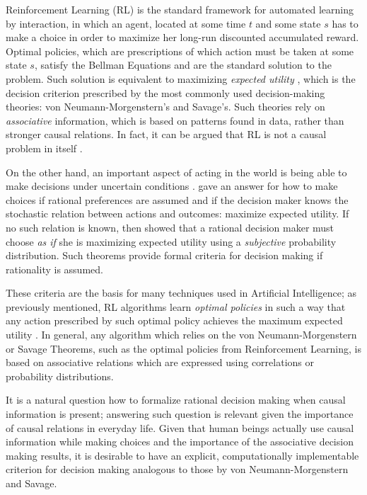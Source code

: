 \documentclass{svjour3}                     %
\begin{document}
Reinforcement Learning (RL) \citep{sutton1998reinforcement} is the standard framework for automated learning by interaction, in which an agent, located at some time $t$ and some state $s$ has to make a choice in order to maximize her long-run discounted accumulated reward. Optimal policies, which are prescriptions of which action must be taken at some state $s$, satisfy the Bellman Equations \citep{Puterman:1994:MDP:528623} and are the standard solution to the problem. Such solution is equivalent to maximizing \textit{expected utility} \citep{webb2007game}, which is the decision criterion prescribed by the most commonly used decision-making theories: von Neumann-Morgenstern's and Savage's. Such theories rely on \textit{associative} information, which is based on patterns found in data, rather than stronger causal relations. In fact, it can be argued that RL is not a causal problem in itself \cite{gonzalezsoto2019reinforcement}.

On the other hand, an important aspect of acting in the world is being able to make decisions under uncertain conditions \citep{bernardo2000bayesian,kahneman2000choices,gilboa2009decision,lake2017building}. \cite{von1944theory} gave an answer for how to make choices if rational preferences are assumed and if the decision maker knows the stochastic relation between actions and outcomes: maximize expected utility. If no such relation is known, then \cite{savage1954the} showed that a rational decision maker must choose \textit{as if} she is maximizing expected utility using a \textit{subjective} probability distribution. Such theorems provide formal criteria for decision making if rationality is assumed. 

These criteria are the basis for many techniques used in Artificial Intelligence; as previously mentioned, RL algorithms learn \textit{optimal policies} in such a way that any action prescribed by such optimal policy achieves the maximum expected utility \citep{sutton1998reinforcement,webb2007game}. In general, any algorithm which relies on the von Neumann-Morgenstern or Savage Theorems, such as the optimal policies from Reinforcement Learning, is based on associative relations which are expressed using correlations or probability distributions. 

It is a natural question how to formalize rational decision making when causal information is present; answering such question is relevant given the importance of causal relations in everyday life. Given that human beings actually use causal information while making choices and the importance of the associative decision making results, it is desirable to have an explicit, computationally implementable criterion for decision making analogous to those by von Neumann-Morgenstern and Savage.
\end{document}
